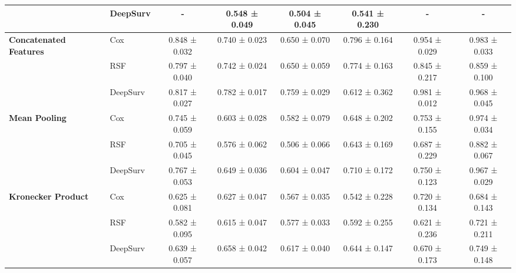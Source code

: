 \begin{sidewaystable}[htbp]
\begin{tabular}{@{}llcccccc@{}}
        & DeepSurv & - & 0.548 ± 0.049 & 0.504 ± 0.045 & 0.541 ± 0.230 & - & - \\
        \midrule
        \multirow{3}{*}{\textbf{Concatenated Features}} & Cox & 0.848 ± 0.032 & 0.740 ± 0.023 & 0.650 ± 0.070 & 0.796 ± 0.164 & 0.954 ± 0.029 & 0.983 ± 0.033 \\
        & RSF & 0.797 ± 0.040 & 0.742 ± 0.024 & 0.650 ± 0.059 & 0.774 ± 0.163 & 0.845 ± 0.217 & 0.859 ± 0.100 \\
        & DeepSurv & 0.817 ± 0.027 & 0.782 ± 0.017 & 0.759 ± 0.029 & 0.612 ± 0.362 & 0.981 ± 0.012 & 0.968 ± 0.045 \\
        \midrule
        \multirow{3}{*}{\textbf{Mean Pooling}} & Cox & 0.745 ± 0.059 & 0.603 ± 0.028 & 0.582 ± 0.079 & 0.648 ± 0.202 & 0.753 ± 0.155 & 0.974 ± 0.034 \\
        & RSF & 0.705 ± 0.045 & 0.576 ± 0.062 & 0.506 ± 0.066 & 0.643 ± 0.169 & 0.687 ± 0.229 & 0.882 ± 0.067 \\
        & DeepSurv & 0.767 ± 0.053 & 0.649 ± 0.036 & 0.604 ± 0.047 & 0.710 ± 0.172 & 0.750 ± 0.123 & 0.967 ± 0.029 \\
        \midrule
        \multirow{3}{*}{\textbf{Kronecker Product}} & Cox & 0.625 ± 0.081 & 0.627 ± 0.047 & 0.567 ± 0.035 & 0.542 ± 0.228 & 0.720 ± 0.134 & 0.684 ± 0.143 \\
        & RSF & 0.582 ± 0.095 & 0.615 ± 0.047 & 0.577 ± 0.033 & 0.592 ± 0.255 & 0.621 ± 0.236 & 0.721 ± 0.211 \\
        & DeepSurv & 0.639 ± 0.057 & 0.658 ± 0.042 & 0.617 ± 0.040 & 0.644 ± 0.147 & 0.670 ± 0.173 & 0.749 ± 0.148 \\
        \bottomrule
    \end{tabular}
\end{sidewaystable}